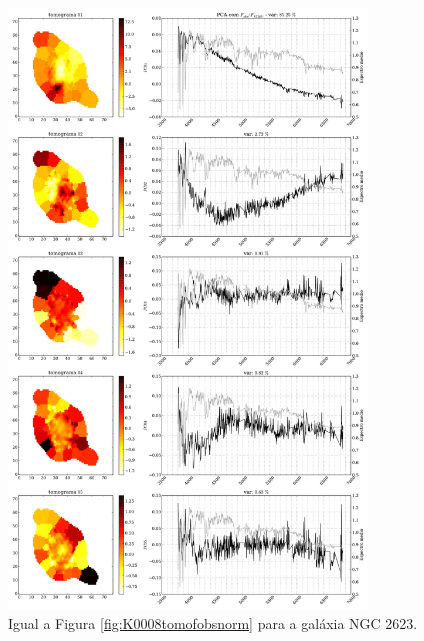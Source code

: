 \begin{figure}
    \includegraphics[width=0.85\textwidth]{figuras/K0213-tomo-obs-norm.pdf}
    \caption[Tomogramas de 1 a 5 para o cubo $F_{obs}$ norm. - NGC 2623.]
    {Igual a Figura \ref{fig:K0008tomofobsnorm} para a galáxia NGC 2623.}
    \label{fig:K0213tomofobsnorm}
\end{figure}

